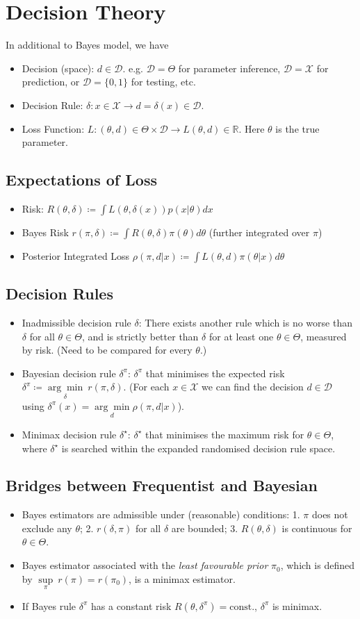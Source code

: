 \documentclass[5pt,a4paper, twocolumn]{article}
\newcommand{\topic}[1]{\section*{#1}}
\newcommand{\subtopic}[1]{\subsection*{#1}}
\begin{document}
{\topic{Decision Theory}
In additional to Bayes model, we have 
\begin{itemize}
    \item Decision (space): $d \in \mathcal{D}$. e.g. $\mathcal{D}=\Theta$ for parameter inference, $\mathcal{D}=\mathcal{X}$ for prediction, or $\mathcal{D}=\{0, 1\}$ for testing, etc.
    \item Decision Rule: $\delta \colon x\in\mathcal{X}\to d=\delta(x)\in\mathcal{D}$.
    \item Loss Function: $L\colon (\theta, d)\in \Theta \times \mathcal{D} \to L(\theta, d)\in\mathbb{R}$. Here $\theta$ is the true parameter.
\end{itemize}

\subtopic{Expectations of Loss}
\begin{itemize}
    \item Risk: $R(\theta, \delta) \coloneqq \int L(\theta, \delta(x))p(x \vert \theta)dx$
    \item Bayes Risk $r(\pi, \delta) \coloneqq \int R(\theta, \delta) \pi(\theta) d\theta$ (further integrated over $\pi$)
    \item Posterior Integrated Loss $\rho(\pi, d \vert x) \coloneqq \int L(\theta, d)\pi(\theta \vert x)d\theta$
\end{itemize}

\subtopic{Decision Rules}
\begin{itemize}
    \item Inadmissible decision rule $\delta$: There exists another rule which is no worse than $\delta$ for all $\theta\in\Theta$, and is strictly better than $\delta$ for at least one $\theta\in\Theta$, measured by risk. (Need to be compared for every $\theta$.)
    \item Bayesian decision rule $\delta^\pi$: $\delta^\pi$ that minimises the expected risk $\delta^\pi \coloneqq \underset{\delta}{\arg \min}\ r(\pi, \delta)$. (For each $x\in\mathcal{X}$ we can find the decision $d\in\mathcal{D}$ using $\delta^{\pi}(x) = \underset{d}{\arg\min} \rho(\pi, d \vert x)$).
    \item Minimax decision rule $\delta^\star$: $\delta^\star$ that minimises the maximum risk for $\theta \in \Theta$, where $\delta^\star$ is searched within the expanded randomised decision rule space. 
\end{itemize}

\subtopic{Bridges between Frequentist and Bayesian}
\begin{itemize}
    \item Bayes estimators are admissible under (reasonable) conditions: 1. $\pi$ does not exclude any $\theta$; 2. $r(\delta, \pi)$ for all $\delta$ are bounded; 3. $R(\theta, \delta)$ is continuous for $\theta \in \Theta$.
    \item Bayes estimator associated with the \emph{least favourable prior} $\pi_0$, which is defined by $\underset{\pi}{\sup}\ r(\pi)=r(\pi_0)$, is a minimax estimator.
    \item If Bayes rule $\delta^\pi$ has a constant risk $R(\theta, \delta^\pi)=\text{const.}$, $\delta^\pi$ is minimax. 


\end{itemize}}
\end{document}
